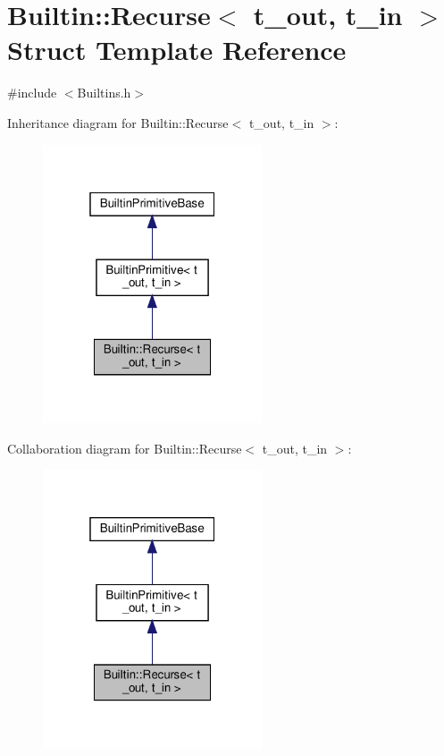 \hypertarget{struct_builtin_1_1_recurse}{}\section{Builtin\+:\+:Recurse$<$ t\+\_\+out, t\+\_\+in $>$ Struct Template Reference}
\label{struct_builtin_1_1_recurse}


{\ttfamily \#include $<$Builtins.\+h$>$}



Inheritance diagram for Builtin\+:\+:Recurse$<$ t\+\_\+out, t\+\_\+in $>$\+:
\nopagebreak
\begin{figure}[H]
\begin{center}
\leavevmode
\includegraphics[width=184pt]{struct_builtin_1_1_recurse__inherit__graph}
\end{center}
\end{figure}


Collaboration diagram for Builtin\+:\+:Recurse$<$ t\+\_\+out, t\+\_\+in $>$\+:
\nopagebreak
\begin{figure}[H]
\begin{center}
\leavevmode
\includegraphics[width=184pt]{struct_builtin_1_1_recurse__coll__graph}
\end{center}
\end{figure}
